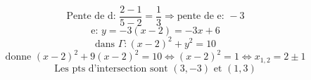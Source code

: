 \documentclass{article}
\begin{document}
\[ \text{Pente de d: } \frac{2-1}{5-2} = \frac{1}{3} \Rightarrow \text{pente de e: } -3 \]
\[ \text{e: } y = -3(x - 2) = -3x + 6 \]
\[ \text{dans } \Gamma: (x-2)^2 + y^2 = 10 \]
\[ \text{donne } (x-2)^2 + 9(x-2)^2 = 10 \Leftrightarrow (x-2)^2 = 1 \Leftrightarrow x_{1,2} = 2 \pm 1 \]
\[ \text{Les pts d'intersection sont } (3,-3) \text{ et } (1,3) \]
\end{document}
